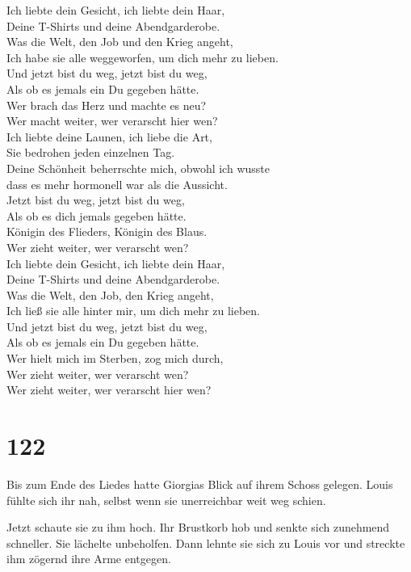 Ich liebte dein Gesicht, ich liebte dein Haar,\\
Deine T-Shirts und deine Abendgarderobe.\\
Was die Welt, den Job und den Krieg angeht,\\
Ich habe sie alle weggeworfen, um dich mehr zu lieben.\\
Und jetzt bist du weg, jetzt bist du weg,\\
Als ob es jemals ein Du gegeben hätte.\\
Wer brach das Herz und machte es neu?\\
Wer macht weiter, wer verarscht hier wen?\\
Ich liebte deine Launen, ich liebe die Art,\\
Sie bedrohen jeden einzelnen Tag.\\
Deine Schönheit beherrschte mich, obwohl ich wusste\\
dass es mehr hormonell war als die Aussicht.\\
Jetzt bist du weg, jetzt bist du weg,\\
Als ob es dich jemals gegeben hätte.\\
Königin des Flieders, Königin des Blaus.\\
Wer zieht weiter, wer verarscht wen?\\
Ich liebte dein Gesicht, ich liebte dein Haar,\\
Deine T-Shirts und deine Abendgarderobe.\\
Was die Welt, den Job, den Krieg angeht,\\
Ich ließ sie alle hinter mir, um dich mehr zu lieben.\\
Und jetzt bist du weg, jetzt bist du weg,\\
Als ob es jemals ein Du gegeben hätte.\\
Wer hielt mich im Sterben, zog mich durch,\\
Wer zieht weiter, wer verarscht wen?\\
Wer zieht weiter, wer verarscht hier wen?

\chapter{122}\label{section-122}

Bis zum Ende des Liedes hatte Giorgias Blick auf ihrem Schoss gelegen.
Louis fühlte sich ihr nah, selbst wenn sie unerreichbar weit weg schien.

Jetzt schaute sie zu ihm hoch. Ihr Brustkorb hob und senkte sich
zunehmend schneller. Sie lächelte unbeholfen. Dann lehnte sie sich zu
Louis vor und streckte ihm zögernd ihre Arme entgegen.

